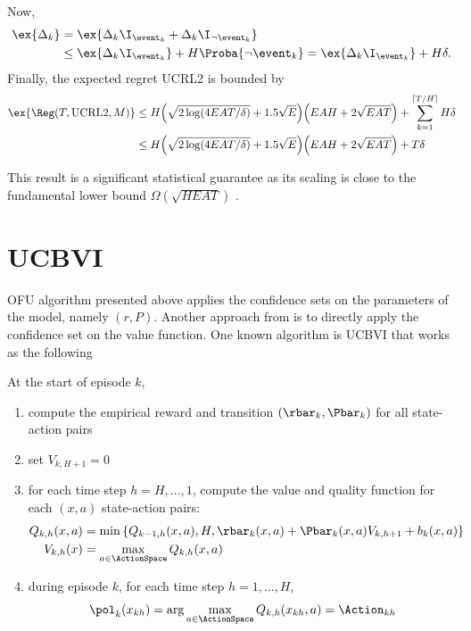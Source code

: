         Now,
        \begin{align*}
            \ex{\Delta_k}
            &=\ex{\Delta_k\I_{\event_k} +\Delta_k\I_{\neg\event_k}} \\
            &\le \ex{\Delta_k\I_{\event_k}} +H\Proba{\neg\event_k} =\ex{\Delta_k\I_{\event_k}} +H\delta.
        \end{align*}
        Finally, the expected regret UCRL2 is bounded by
        \begin{align*}
            \ex{\Reg(T,\mathrm{UCRL2},M)} 
            &\le H\Big(\sqrt{2\log(4EAT/\delta)} +1.5\sqrt{E}\Big) \Big(EAH +2\sqrt{EAT}\Big) +\sum_{k=1}^{\lceil T/H\rceil}H\delta \\
            &\le H\Big(\sqrt{2\log(4EAT/\delta)} +1.5\sqrt{E}\Big) \Big(EAH +2\sqrt{EAT}\Big) +T\delta
        \end{align*}
        
        This result is a significant statistical guarantee as its scaling is close to the fundamental lower bound $\Omega(\sqrt{HEAT})$ \cite{jaksch2010near, osband2016lower}.

\section{UCBVI}
\label{sec:ucbvi}
    OFU algorithm presented above applies the confidence sets on the parameters of the model, namely $(r,P)$. Another approach from \cite{azar2017minimax} is to directly apply the confidence set on the value function. One known algorithm is UCBVI that works as the following
    
    At the start of episode $k$,
    \begin{enumerate}
        \item compute the empirical reward and transition $(\rbar_k,\Pbar_k)$ for all state-action pairs
        \item set $V_{k,H+1}=0$
        \item for each time step $h=H,\dots,1$, compute the value and quality function for each $(x,a)$ state-action pairs:
        \begin{align*}
            Q_{k,h}(x,a) &=\min\left\{Q_{k-1,h}(x,a), H, \rbar_k(x,a) +\Pbar_k(x,a)V_{k,h+1} +b_k(x,a)\right\} \\
            V_{k,h}(x) &= \max_{a\in\ActionSpace}Q_{k,h}(x,a)
        \end{align*}
        \item during episode $k$, for each time step $h=1,\dots,H$, 
        \begin{align*}
            \pol_{k}(x_{kh}) =\arg\max_{a\in\ActionSpace}Q_{k,h}(x_{kh},a)=\Action_{kh}
        \end{align*}
    \end{enumerate}
    
